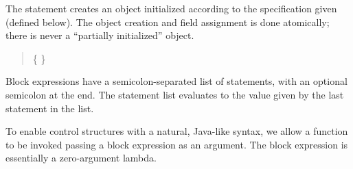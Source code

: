The  statement creates an object initialized according to
the  specification given (defined below).  The object
creation and field assignment is done atomically; there is never a
``partially initialized'' object.


\begin{quote}


 \{  \}


 {}  \opt{;}

\end{quote}

Block expressions have a semicolon-separated list of statements, with
an optional semicolon at the end.  The statement list evaluates to the
value given by the last statement in the list.

\begin{quote}


 {}

 {} 

\end{quote}

To enable control structures with a natural, Java-like syntax, we allow
a function to be invoked passing a block expression as an argument.  The
block expression is essentially a zero-argument lambda.

